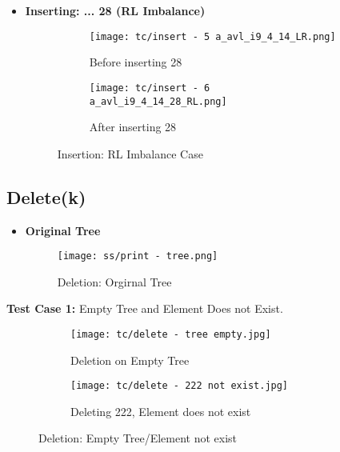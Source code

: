 \documentclass{article}
\begin{document}
\begin{itemize}
     \item \textbf{Inserting: ... 28 (RL Imbalance)}\newline
        \begin{figure}[H]
            \begin{subfigure}{0.5\textwidth}
                \centering
                \texttt{[image: tc/insert - 5 a\_avl\_i9\_4\_14\_LR.png]} 
                \caption{Before inserting 28}
            \end{subfigure}
            \begin{subfigure}{0.5\textwidth}
                \centering
                \texttt{[image: tc/insert - 6 a\_avl\_i9\_4\_14\_28\_RL.png]}
                \caption{After inserting 28}
            \end{subfigure}
            \caption{Insertion: RL Imbalance Case}
        \label{fig:Insert_Tree_RL}
        \end{figure}
   
\end{itemize}


\subsection{Delete(k)}
\begin{itemize}
    \item \textbf{Original Tree}\newline
	    \begin{figure}[H]
            \centering
                \texttt{[image: ss/print - tree.png]}
            \caption{Deletion: Orgirnal Tree}
            \label{fig:dtc_Insert_Tree_initial}
        \end{figure}
\end{itemize}

\textbf{Test Case 1:} Empty Tree and Element Does not Exist.
        \begin{figure}[H]
            \begin{subfigure}{0.5\textwidth}
                \centering
                \texttt{[image: tc/delete - tree empty.jpg]} 
                \caption{Deletion on Empty Tree}
            \end{subfigure}
            \begin{subfigure}{0.5\textwidth}
                \centering
                \texttt{[image: tc/delete - 222 not exist.jpg]}
                \caption{Deleting 222, Element does not exist}
            \end{subfigure}
            \caption{Deletion: Empty Tree/Element not exist}
        \label{fig:Deletion_TC_1}
        \end{figure}
\end{document}
